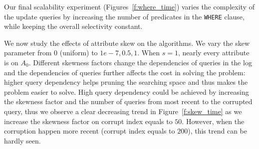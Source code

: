Our final scalability experiment (Figures~\ref{f:where_time})
varies the complexity of the update queries by increasing the number of predicates in the \texttt{WHERE} clause, 
while keeping the overall selectivity constant.  

 We now study the effects of attribute skew on the algorithms.
We vary the skew parameter from $0$ (uniform) to $1e-7, 0.5, 1$. When $s=1$, nearly every attribute is on $A_0$.
Different skewness factors change the dependencies of queries in the log and the dependencies of queries further affects the cost in solving the problem: higher query dependency helps pruning the searching space and thus makes the problem easier to solve. High query dependency could be achieved by increasing the skewness factor and the number of queries from most recent to the corrupted query, thus
we observe a clear decreasing trend in Figure~\ref{f:skew_time} as we increase the skewness factor on corrupt index equals to $50$. However, when the corruption happen more recent (corrupt index equals to $200$), this trend can be hardly seen. 


% 
% 
% 
 
